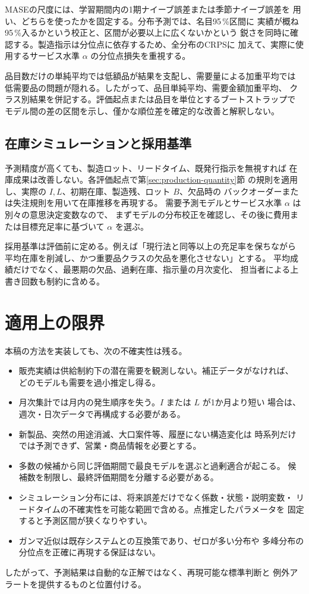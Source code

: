 \documentclass[a4paper,11pt]{jsarticle}
\begin{document}
MASEの尺度には、学習期間内の1期ナイーブ誤差または季節ナイーブ誤差を
用い、どちらを使ったかを固定する。分布予測では、名目95\,\%区間に
実績が概ね95\,\%入るかという校正と、区間が必要以上に広くないかという
鋭さを同時に確認する。製造指示は分位点に依存するため、全分布のCRPSに
加えて、実際に使用するサービス水準 $\alpha$ の分位点損失を重視する。

品目数だけの単純平均では低額品が結果を支配し、需要量による加重平均では
低需要品の問題が隠れる。したがって、品目単純平均、需要金額加重平均、
クラス別結果を併記する。評価起点または品目を単位とするブートストラップで
モデル間の差の区間を示し、僅かな順位差を確定的な改善と解釈しない。

\subsection{在庫シミュレーションと採用基準}
予測精度が高くても、製造ロット、リードタイム、既発行指示を無視すれば
在庫成果は改善しない。各評価起点で第\ref{sec:production-quantity}節
の規則を適用し、実際の $I,L$、初期在庫、製造残、ロット $B$、欠品時の
バックオーダーまたは失注規則を用いて在庫推移を再現する。
需要予測モデルとサービス水準 $\alpha$ は別々の意思決定変数なので、
まずモデルの分布校正を確認し、その後に費用または目標充足率に基づいて
$\alpha$ を選ぶ。

採用基準は評価前に定める。例えば「現行法と同等以上の充足率を保ちながら
平均在庫を削減し、かつ重要品クラスの欠品を悪化させない」とする。
平均成績だけでなく、最悪期の欠品、過剰在庫、指示量の月次変化、
担当者による上書き回数も制約に含める。

\section{適用上の限界}

本稿の方法を実装しても、次の不確実性は残る。
\begin{itemize}
\item 販売実績は供給制約下の潜在需要を観測しない。補正データがなければ、
どのモデルも需要を過小推定し得る。
\item 月次集計では月内の発生順序を失う。$I$ または $L$ が1か月より短い
場合は、週次・日次データで再構成する必要がある。
\item 新製品、突然の用途消滅、大口案件等、履歴にない構造変化は
時系列だけでは予測できず、営業・商品情報を必要とする。
\item 多数の候補から同じ評価期間で最良モデルを選ぶと過剰適合が起こる。
候補数を制限し、最終評価期間を分離する必要がある。
\item シミュレーション分布には、将来誤差だけでなく係数・状態・説明変数・
リードタイムの不確実性を可能な範囲で含める。点推定したパラメータを
固定すると予測区間が狭くなりやすい。
\item ガンマ近似は既存システムとの互換策であり、ゼロが多い分布や
多峰分布の分位点を正確に再現する保証はない。
\end{itemize}
したがって、予測結果は自動的な正解ではなく、再現可能な標準判断と
例外アラートを提供するものと位置付ける。
\end{document}
